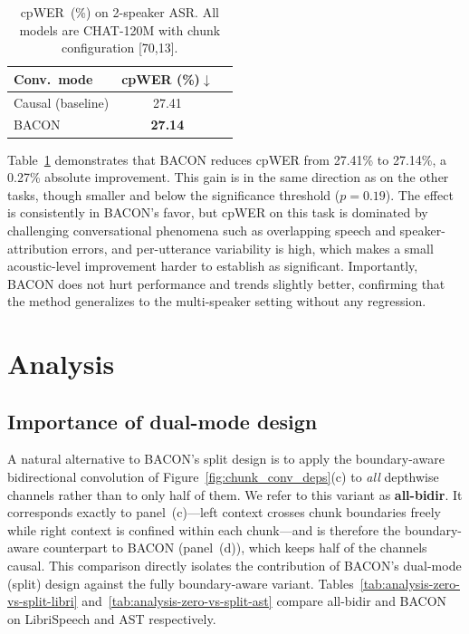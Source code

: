 \documentclass[cameraready]{Interspeech}
\begin{document}
\begin{table}[h]
\centering
\caption{cpWER~(\%) on 2-speaker ASR. All models are CHAT-120M with chunk
configuration [70,13].}
\label{tab:multispk}
\begin{tabular}{lcc}
\toprule
\textbf{Conv.\ mode} & \textbf{cpWER (\%)}$\downarrow$ \\
\midrule
Causal (baseline)      & 27.41 \\
BACON                  & \textbf{27.14} \\
\bottomrule
\end{tabular}
\end{table}

Table~\ref{tab:multispk} demonstrates that BACON reduces cpWER from 27.41\% to 27.14\%, a 0.27\% absolute improvement. This gain is in the same direction as on the other tasks, though smaller and below the significance threshold ($p=0.19$). The effect is consistently in BACON's favor, but cpWER on this task is dominated by challenging conversational phenomena such as overlapping speech and speaker-attribution errors, and per-utterance variability is high, which makes a small acoustic-level improvement harder to establish as significant. Importantly, BACON does not hurt performance and trends slightly better, confirming that the method generalizes to the multi-speaker setting without any regression.




\section{Analysis}
\label{sec:analysis}

\subsection{Importance of dual-mode design}
\label{subsec:analysis-zero-vs-split}

A natural alternative to BACON's split design is to apply the boundary-aware
bidirectional convolution of Figure~\ref{fig:chunk_conv_deps}(c) to \emph{all}
depthwise channels rather than to only half of them. We refer to this variant as
\textbf{all-bidir}. It corresponds exactly to panel~(c)---left context crosses
chunk boundaries freely while right context is confined within each chunk---and
is therefore the boundary-aware counterpart to BACON (panel~(d)), which keeps
half of the channels causal. This comparison directly isolates the contribution
of BACON's dual-mode (split) design against the fully boundary-aware variant.
Tables~\ref{tab:analysis-zero-vs-split-libri}
and~\ref{tab:analysis-zero-vs-split-ast} compare all-bidir and BACON on
LibriSpeech and AST respectively.
\end{document}
